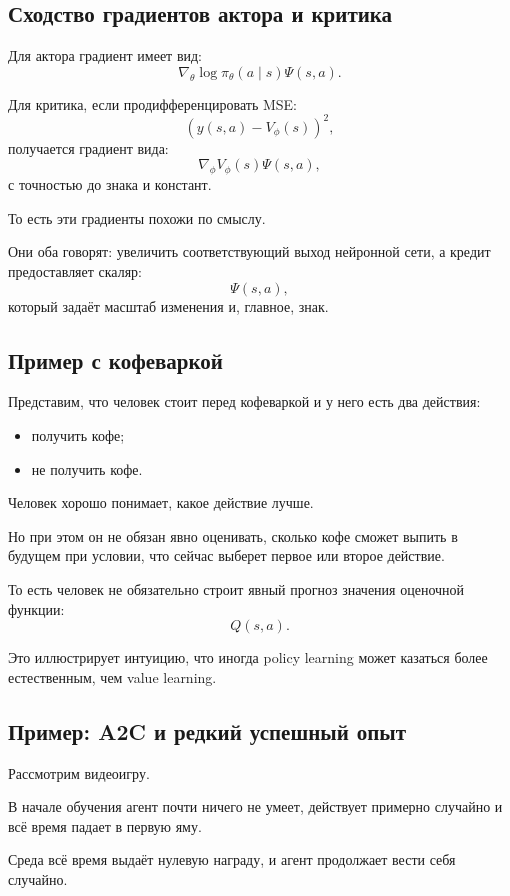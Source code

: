 \documentclass[12pt,a4paper]{article}
\begin{document}
\subsection{Сходство градиентов актора и критика}

Для актора градиент имеет вид:
\[
\nabla_\theta
\log \pi_\theta(a\mid s)
\Psi(s,a).
\]

Для критика, если продифференцировать MSE:
\[
\left(
y(s,a)-V_\phi(s)
\right)^2,
\]
получается градиент вида:
\[
\nabla_\phi V_\phi(s)
\Psi(s,a),
\]
с точностью до знака и констант.

То есть эти градиенты похожи по смыслу.

Они оба говорят: увеличить соответствующий выход нейронной сети, а кредит предоставляет скаляр:
\[
\Psi(s,a),
\]
который задаёт масштаб изменения и, главное, знак.

\subsection{Пример с кофеваркой}

Представим, что человек стоит перед кофеваркой и у него есть два действия:
\begin{itemize}
    \item получить кофе;
    \item не получить кофе.
\end{itemize}

Человек хорошо понимает, какое действие лучше.

Но при этом он не обязан явно оценивать, сколько кофе сможет выпить в будущем при условии, что сейчас выберет первое или второе действие.

То есть человек не обязательно строит явный прогноз значения оценочной функции:
\[
Q(s,a).
\]

Это иллюстрирует интуицию, что иногда policy learning может казаться более естественным, чем value learning.

\subsection{Пример: A2C и редкий успешный опыт}

Рассмотрим видеоигру.

В начале обучения агент почти ничего не умеет, действует примерно случайно и всё время падает в первую яму.

Среда всё время выдаёт нулевую награду, и агент продолжает вести себя случайно.
\end{document}
